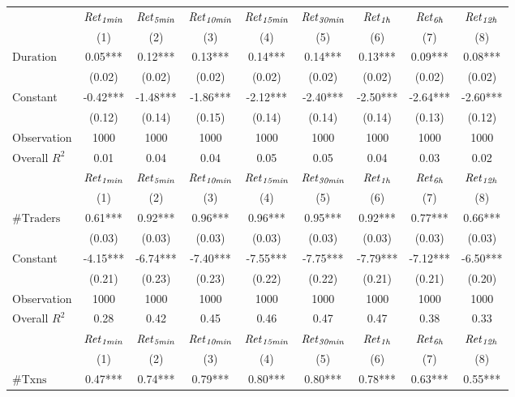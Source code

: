 \begin{tabular}{lcccccccc}
\hline
 & ${\it Ret}_{\it 1min}$ & ${\it Ret}_{\it 5min}$ & ${\it Ret}_{\it 10min}$ & ${\it Ret}_{\it 15min}$ & ${\it Ret}_{\it 30min}$ & ${\it Ret}_{\it 1h}$ & ${\it Ret}_{\it 6h}$ & ${\it Ret}_{\it 12h}$ \\
 & (1) & (2) & (3) & (4) & (5) & (6) & (7) & (8) \\
\hline
$\text{Duration}$ & 0.05*** & 0.12*** & 0.13*** & 0.14*** & 0.14*** & 0.13*** & 0.09*** & 0.08*** \\
 & (0.02) & (0.02) & (0.02) & (0.02) & (0.02) & (0.02) & (0.02) & (0.02) \\
Constant & -0.42*** & -1.48*** & -1.86*** & -2.12*** & -2.40*** & -2.50*** & -2.64*** & -2.60*** \\
 & (0.12) & (0.14) & (0.15) & (0.14) & (0.14) & (0.14) & (0.13) & (0.12) \\
Observation & 1000 & 1000 & 1000 & 1000 & 1000 & 1000 & 1000 & 1000 \\
Overall $R^2$ & 0.01 & 0.04 & 0.04 & 0.05 & 0.05 & 0.04 & 0.03 & 0.02 \\
\hline
 & ${\it Ret}_{\it 1min}$ & ${\it Ret}_{\it 5min}$ & ${\it Ret}_{\it 10min}$ & ${\it Ret}_{\it 15min}$ & ${\it Ret}_{\it 30min}$ & ${\it Ret}_{\it 1h}$ & ${\it Ret}_{\it 6h}$ & ${\it Ret}_{\it 12h}$ \\
 & (1) & (2) & (3) & (4) & (5) & (6) & (7) & (8) \\
\hline
$\#\text{Traders}$ & 0.61*** & 0.92*** & 0.96*** & 0.96*** & 0.95*** & 0.92*** & 0.77*** & 0.66*** \\
 & (0.03) & (0.03) & (0.03) & (0.03) & (0.03) & (0.03) & (0.03) & (0.03) \\
Constant & -4.15*** & -6.74*** & -7.40*** & -7.55*** & -7.75*** & -7.79*** & -7.12*** & -6.50*** \\
 & (0.21) & (0.23) & (0.23) & (0.22) & (0.22) & (0.21) & (0.21) & (0.20) \\
Observation & 1000 & 1000 & 1000 & 1000 & 1000 & 1000 & 1000 & 1000 \\
Overall $R^2$ & 0.28 & 0.42 & 0.45 & 0.46 & 0.47 & 0.47 & 0.38 & 0.33 \\
\hline
 & ${\it Ret}_{\it 1min}$ & ${\it Ret}_{\it 5min}$ & ${\it Ret}_{\it 10min}$ & ${\it Ret}_{\it 15min}$ & ${\it Ret}_{\it 30min}$ & ${\it Ret}_{\it 1h}$ & ${\it Ret}_{\it 6h}$ & ${\it Ret}_{\it 12h}$ \\
 & (1) & (2) & (3) & (4) & (5) & (6) & (7) & (8) \\
\hline
$\#\text{Txns}$ & 0.47*** & 0.74*** & 0.79*** & 0.80*** & 0.80*** & 0.78*** & 0.63*** & 0.55*** \\

\end{tabular}
